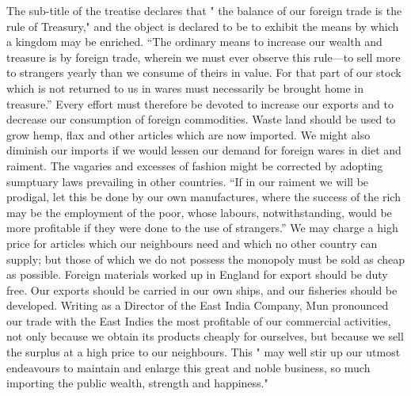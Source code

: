 \documentclass{book}
\begin{document}
The sub-title of the treatise declares that " the balance of our foreign trade is the rule of Treasury," and the object is declared to be to exhibit the means by which a kingdom may be enriched. “The ordinary means to increase our wealth and treasure is by foreign trade, wherein we must ever observe this rule—to sell more to strangers yearly than we consume of theirs in value. For that part of our stock which is not returned to us in wares must necessarily be brought home in treasure.” Every effort must therefore be devoted to increase our exports and to decrease our consumption of foreign commodities. Waste land should be used to grow hemp, flax and other articles which are now imported. We might also diminish our imports if we would lessen our demand for foreign wares in diet and raiment. The vagaries and excesses of fashion might be corrected by adopting sumptuary laws prevailing in other countries. “If in our raiment we will be prodigal, let this be done by our own manufactures, where the success of the rich may be the employment of the poor, whose labours, notwithstanding, would be more profitable if they were done to the use of strangers.” We may charge a high price for articles which our neighbours need and which no other country can supply; but those of which we do not possess the monopoly must be sold as cheap as possible. Foreign materials worked up in England for export should be duty free. Our exports should be carried in our own ships, and our fisheries should be developed. Writing as a Director of the East India Company, Mun pronounced our trade with the East Indies the most profitable of our commercial activities, not only because we obtain its products cheaply for ourselves, but because we sell the surplus at a high price to our neighbours. This " may well stir up our utmost endeavours to maintain and enlarge this great and noble business, so much importing the public wealth, strength and happiness."\footnotemark[3]
\end{document}
